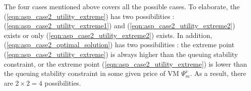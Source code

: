 \documentclass[conference]{IEEEtran}
\begin{document}

The four cases mentioned above covers all the possible cases. To elaborate, the (\ref{eqn:asp_case2_utility_extreme}) has two possibilities : (\ref{eqn:asp_case2_utility_extreme1}) and (\ref{eqn:asp_case2_utility_extreme2}) exists or only (\ref{eqn:asp_case2_utility_extreme2}) exists. In addition,  (\ref{eqn:asp_case2_optimal_solution}) has two possibilities : the extreme point (\ref{eqn:asp_case2_utility_extreme}) is always higher than the queuing stability constraint, or the extreme point (\ref{eqn:asp_case2_utility_extreme}) is lower than the queuing stability constraint in some given price of VM $\Psi_m^v$. As a result, there are $2 \times 2 = 4$ possibilities.
\end{document}
